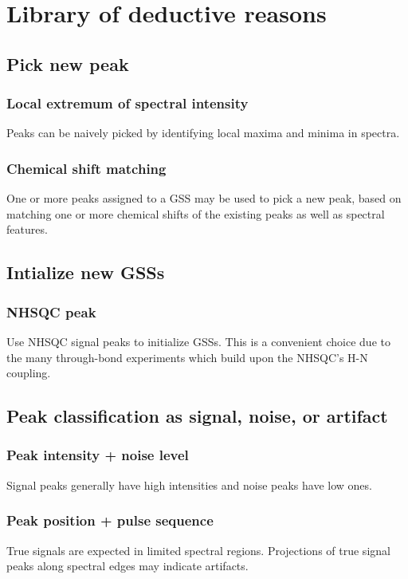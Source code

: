 \chapter{Library of deductive reasons}
\label{sec_library}



\section*{Pick new peak}

\subsection*{Local extremum of spectral intensity}
Peaks can be naively picked by identifying local maxima and minima in spectra.

\subsection*{Chemical shift matching}
One or more peaks assigned to a GSS may be used to pick a new peak,
based on matching one or more chemical shifts of the existing peaks
as well as spectral features.



\section*{Intialize new GSSs}

\subsection*{NHSQC peak}
Use NHSQC signal peaks to initialize GSSs.  This is a convenient choice due
to the many through-bond experiments which build upon the NHSQC's H-N coupling.



\section*{Peak classification as signal, noise, or artifact}

\subsection*{Peak intensity + noise level}
Signal peaks generally have high intensities and noise peaks have low ones.

\subsection*{Peak position + pulse sequence}
True signals are expected in limited spectral regions.
Projections of true signal peaks along spectral edges may indicate artifacts.

